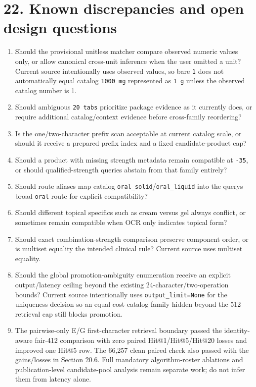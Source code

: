 \section{22. Known discrepancies and open design questions}\label{22-known-discrepancies-and-open-design-questions}

\begin{enumerate}
\def\labelenumi{\arabic{enumi}.}
\tightlist
\item
  Should the provisional unitless matcher compare observed numeric values only, or allow canonical cross-unit inference when the user omitted a unit? Current source intentionally uses observed values, so bare \texttt{1} does not automatically equal catalog \texttt{1000\ mg} represented as \texttt{1\ g} unless the observed catalog number is 1.
\item
  Should ambiguous \texttt{20\ tabs} prioritize package evidence as it currently does, or require additional catalog/context evidence before cross-family reordering?
\item
  Is the one/two-character prefix scan acceptable at current catalog scale, or should it receive a prepared prefix index and a fixed candidate-product cap?
\item
  Should a product with missing strength metadata remain compatible at \texttt{-35}, or should qualified-strength queries abstain from that family entirely?
\item
  Should route aliases map catalog \texttt{oral\_\allowbreak{}solid}/\texttt{oral\_\allowbreak{}liquid} into the query\textquotesingle s broad \texttt{oral} route for explicit compatibility?
\item
  Should different topical specifics such as cream versus gel always conflict, or sometimes remain compatible when OCR only indicates topical form?
\item
  Should exact combination-strength comparison preserve component order, or is multiset equality the intended clinical rule? Current source uses multiset equality.
\item
  Should the global promotion-ambiguity enumeration receive an explicit output/latency ceiling beyond the existing 24-character/two-operation bounds? Current source intentionally uses \texttt{output\_\allowbreak{}limit=None} for the uniqueness decision so an equal-cost catalog family hidden beyond the 512 retrieval cap still blocks promotion.
\item
  The pairwise-only E/G first-character retrieval boundary passed the identity-aware fair-412 comparison with zero paired Hit@1/Hit@5/Hit@20 losses and improved one Hit@5 row. The 66,257 clean paired check also passed with the gains/losses in Section 20.6. Full mandatory algorithm-roster ablations and publication-level candidate-pool analysis remain separate work; do not infer them from latency alone.

\end{enumerate}
